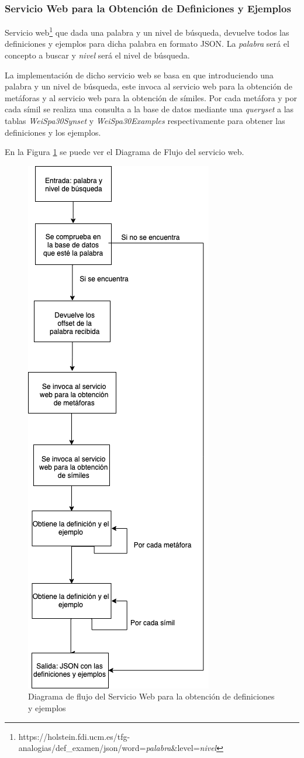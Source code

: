 \subsubsection{Servicio Web para la Obtención de Definiciones y Ejemplos}
\label{cap:subsec:sw_def_example}
Servicio web\footnote{https://holstein.fdi.ucm.es/tfg-analogias/def\_examen/json/word=\textit{palabra}\&level=\textit{nivel}} que dada una palabra y un nivel de búsqueda, devuelve todos las definiciones y ejemplos para dicha palabra en formato JSON. La \textit{palabra} será el concepto a buscar y \textit{nivel} será el nivel de búsqueda.

La implementación de dicho servicio web se basa en que introduciendo una palabra y un nivel de búsqueda, este invoca al servicio web para la obtención de metáforas y al servicio web para la obtención de símiles. Por cada metáfora y por cada símil se realiza una consulta a la base de datos mediante una \textit{queryset} a las tablas \textit{WeiSpa30Synset} y \textit{WeiSpa30Examples} respectivamente para obtener las definiciones y los ejemplos.


En la Figura \ref{fig:swdef} se puede ver el Diagrama de Flujo del servicio web.
\begin{figure}[!h]
	\includegraphics[width=.5\textwidth]{Imagenes/Bitmap/Capitulo4/ServiciosWeb/DiagramaFlujoDefinicionYEjemplo.png}
	\centering
	\caption{Diagrama de flujo del Servicio Web para la obtención de definiciones y ejemplos}
	\label{fig:swdef}
\end{figure}


